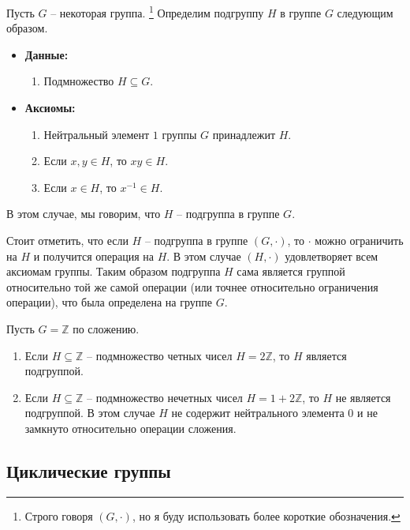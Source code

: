 \begin{definition}
Пусть $G$ -- некоторая группа.%
\footnote{Строго говоря $(G,\cdot)$, но я буду использовать более короткие обозначения.}
Определим подгруппу $H$ в группе $G$ следующим образом.
\begin{itemize}
\item \textbf{Данные:} 
\begin{enumerate}
\item Подмножество $H\subseteq G$.
\end{enumerate}
\item \textbf{Аксиомы:}
\begin{enumerate}
\item Нейтральный элемент $1$ группы $G$ принадлежит $H$.

\item Если $x,y\in H$, то $x  y\in H$.

\item Если $x\in H$, то $x^{-1}\in H$.
\end{enumerate}
\end{itemize}
В этом случае, мы говорим, что $H$ -- подгруппа в группе $G$.
\end{definition}

Стоит отметить, что если $H$ -- подгруппа в группе $(G,\cdot)$, то $\cdot$ можно ограничить на $H$ и получится операция на $H$.
В этом случае $(H, \cdot)$ удовлетворяет всем аксиомам группы.
Таким образом подгруппа $H$ сама является группой относительно той же самой операции (или точнее относительно ограничения операции), что была определена на группе $G$.

\begin{examples}
Пусть $G =\mathbb Z$ по сложению.
\begin{enumerate}
\item Если $H\subseteq \mathbb Z$ -- подмножество четных чисел $H = 2\mathbb Z$, то $H$ является подгруппой.

\item Если $H\subseteq \mathbb Z$ -- подмножество нечетных чисел $H = 1 + 2 \mathbb Z$, то $H$ не является подгруппой.
В этом случае $H$ не содержит нейтрального элемента $0$ и не замкнуто относительно операции сложения.
\end{enumerate}
\end{examples}

\subsection{Циклические группы}

